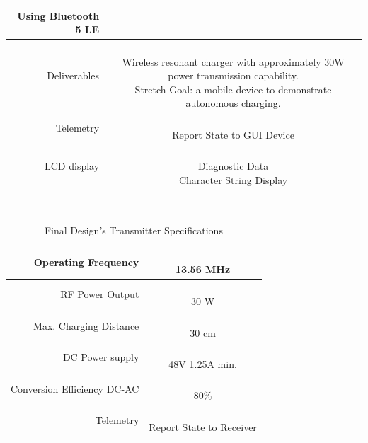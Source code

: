 \documentclass[12pt]{article}
\begin{document}
\begin{table}[h!]
\begin{tabular} {| r | c | }
{Using Bluetooth 5 LE
}\\
\hline
\parbox{0.3\linewidth}{\raggedleft
Deliverables
} &   \parbox{0.65\linewidth}{\hfill \\
Wireless resonant charger with approximately 30W power transmission capability.\\
Stretch Goal: a mobile device to demonstrate autonomous charging.
}\\
\hline
\parbox{0.3\linewidth}{\raggedleft
Telemetry
} &   \parbox{0.65\linewidth}{\hfill \\
Report State to GUI Device
}\\
\hline
\parbox{0.3\linewidth}{\raggedleft
LCD display
} &   \parbox{0.65\linewidth}{\hfill \\
Diagnostic Data\\
Character String Display
}\\
\hline
%
%
\end{tabular}
\end{table}
\hfill \\


\begin{table}[h!]
\centering
\caption{Final Design's Transmitter Specifications}
\begin{tabular} {| r | c | }
\hline
\parbox{0.3\linewidth}{\raggedleft
Operating Frequency
} &   \parbox{0.65\linewidth}{\hfill \\
13.56 MHz
}\\
\hline
\parbox{0.3\linewidth}{\raggedleft
RF Power Output
} &   \parbox{0.65\linewidth}{\hfill \\
30 W
}\\
\hline
\parbox{0.3\linewidth}{\raggedleft
Max. Charging Distance
} &   \parbox{0.65\linewidth}{\hfill \\
30 cm
}\\
\hline
\parbox{0.3\linewidth}{\raggedleft
DC Power supply
} &   \parbox{0.65\linewidth}{\hfill \\
48V 1.25A min.
}\\
\hline
\parbox{0.3\linewidth}{\raggedleft
Conversion Efficiency DC-AC
} &   \parbox{0.65\linewidth}{\hfill \\
80\%
}\\
\hline
\parbox{0.3\linewidth}{\raggedleft
Telemetry
} &   \parbox{0.65\linewidth}{\hfill \\
Report State to Receiver
}\\
\hline
%
%
\end{tabular}
\end{table}
\hfill \\
\end{document}
